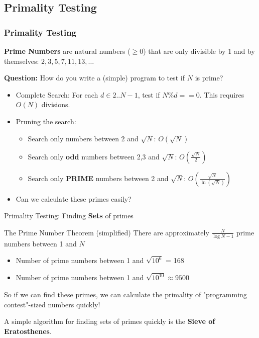 \subsection{Primality Testing}
\begin{frame}
  \frametitle{Primality Testing}

    {\bf Prime Numbers} are natural numbers ($\geq 0$) that are only divisible by 1 and by themselves: $2,3,5,7,11,13,\ldots$\bigskip

    {\bf Question:} How do you write a (simple) program to test if $N$ is prime?
    \begin{itemize}

      \item Complete Search: For each $d \in 2..N-1$, test if $N\%d == 0$. This requires $O(N)$ divisions.\medskip

      \item Pruning the search:
      \begin{itemize}
        \item Search only numbers between 2 and $\sqrt{N}$: $O(\sqrt{N})$
        \item Search only {\bf odd} numbers between 2,3 and $\sqrt{N}$: $O(\frac{\sqrt{N}}{2})$
        \item Search only {\bf PRIME} numbers between 2 and $\sqrt{N}$:
        $O(\frac{\sqrt{N}}{\ln(\sqrt{N})})$
      \end{itemize}\medskip

      \item Can we calculate these primes easily?
    \end{itemize}
\end{frame}

\begin{frame}{Primality Testing: Finding {\bf Sets} of primes}

  \begin{block}{The Prime Number Theorem (simplified)}
    There are approximately $\frac{N}{\log{N}-1}$ prime numbers between 1 and $N$
  \end{block}\bigskip

  \begin{itemize}
    \item Number of prime numbers between 1 and $\sqrt{10^6}$ = 168
    \item Number of prime numbers between 1 and $\sqrt{10^{10}} \approx 9500$
  \end{itemize}\bigskip

  So if we can find these primes, we can calculate the primality of "programming contest"-sized numbers quickly!\bigskip

  A simple algorithm for finding sets of primes quickly is the {\bf Sieve of Eratosthenes}.
\end{frame}



